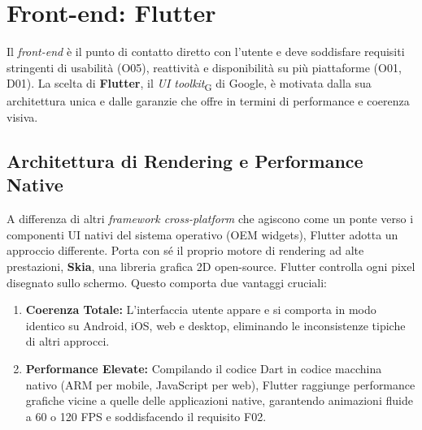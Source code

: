 \section{Front-end: Flutter}
\label{sec:frontend}
Il \textit{front-end} è il punto di contatto diretto con l'utente e deve soddisfare requisiti stringenti di usabilità (O05), reattività e disponibilità su più piattaforme (O01, D01). La scelta di \textbf{Flutter}, il \textit{UI toolkit}\textsubscript{G} di Google, è motivata dalla sua architettura unica e dalle garanzie che offre in termini di performance e coerenza visiva.

\subsection{Architettura di Rendering e Performance Native}
A differenza di altri \textit{framework cross-platform} che agiscono come un ponte verso i componenti UI nativi del sistema operativo (OEM widgets), Flutter adotta un approccio differente. Porta con sé il proprio motore di rendering ad alte prestazioni, \textbf{Skia}, una libreria grafica 2D open-source. Flutter controlla ogni pixel disegnato sullo schermo. Questo comporta due vantaggi cruciali:
\begin{enumerate}
    \item \textbf{Coerenza Totale:} L'interfaccia utente appare e si comporta in modo identico su Android, iOS, web e desktop, eliminando le inconsistenze tipiche di altri approcci.
    \item \textbf{Performance Elevate:} Compilando il codice Dart in codice macchina nativo (ARM per mobile, JavaScript per web), Flutter raggiunge performance grafiche vicine a quelle delle applicazioni native, garantendo animazioni fluide a 60 o 120 FPS e soddisfacendo il requisito F02.
\end{enumerate}

